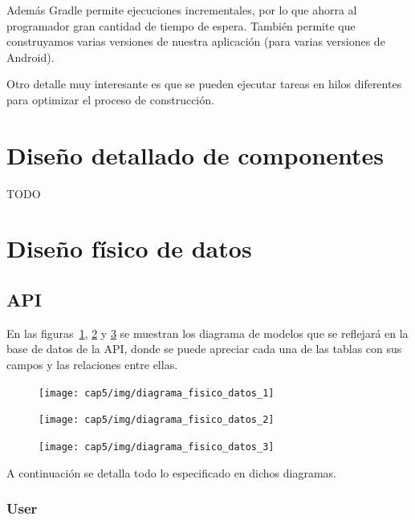 Además Gradle permite ejecuciones incrementales, por lo que ahorra al
programador gran cantidad de tiempo de espera. También permite que construyamos
varias versiones de nuestra aplicación (para varias versiones de Android).

Otro detalle muy interesante es que se pueden ejecutar tareas en hilos
diferentes para optimizar el proceso de construcción.


\section{Diseño detallado de componentes}

TODO


\section{Diseño físico de datos}

\subsection{API}

En las figuras~\ref{fig:diagrama-fisico-datos-1},
\ref{fig:diagrama-fisico-datos-2} y \ref{fig:diagrama-fisico-datos-3} se
muestran los diagrama de modelos que se reflejará en la base de datos de la API,
donde se puede apreciar cada una de las tablas con sus campos y las relaciones
entre ellas.


\begin{figure}[htbp]
  \centering
  \texttt{[image: cap5/img/diagrama\_fisico\_datos\_1]}
  \caption{}
  \label{fig:diagrama-fisico-datos-1}
\end{figure}

\begin{figure}[htbp]
  \centering
  \texttt{[image: cap5/img/diagrama\_fisico\_datos\_2]}
  \caption{}
  \label{fig:diagrama-fisico-datos-2}
\end{figure}

\begin{figure}[htbp]
  \centering
  \texttt{[image: cap5/img/diagrama\_fisico\_datos\_3]}
  \caption{}
  \label{fig:diagrama-fisico-datos-3}
\end{figure}


A continuación se detalla todo lo especificado en dichos diagramas.

\subsubsection{User}



